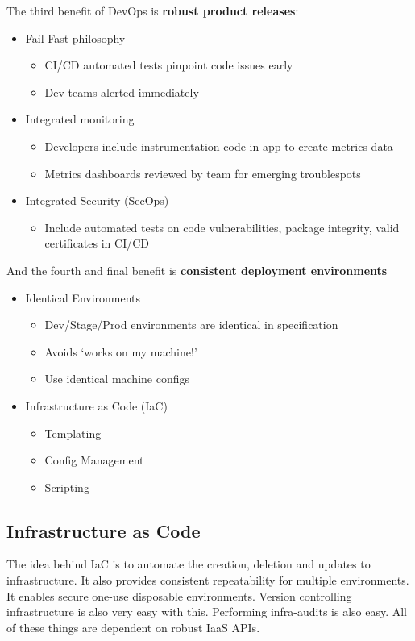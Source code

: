 \documentclass[11pt,a4paper,titlepage,dvipsnames,cmyk]{scrartcl}
\begin{document}
The third benefit of DevOps is \textbf{robust product releases}:
\begin{itemize}
    \item Fail-Fast philosophy
    \begin{itemize}
        \item CI/CD automated tests pinpoint code issues early
        \item Dev teams alerted immediately
    \end{itemize}
    \item Integrated monitoring
    \begin{itemize}
        \item Developers include instrumentation code in app to create metrics data
        \item Metrics dashboards reviewed by team for emerging troublespots
    \end{itemize}
    \item Integrated Security (SecOps)
    \begin{itemize}
        \item Include automated tests on code vulnerabilities, package integrity, valid certificates in CI/CD
    \end{itemize}
\end{itemize}

And the fourth and final benefit is \textbf{consistent deployment environments}
\begin{itemize}
    \item Identical Environments
    \begin{itemize}
        \item Dev/Stage/Prod environments are identical in specification
        \item Avoids `works on my machine!'
        \item Use identical machine configs
    \end{itemize}
    \item Infrastructure as Code (IaC)
    \begin{itemize}
        \item Templating
        \item Config Management
        \item Scripting
    \end{itemize}
\end{itemize}

\subsection{Infrastructure as Code}
The idea behind IaC is to automate the creation, deletion and updates to infrastructure. It also provides consistent repeatability for multiple environments. It enables secure one-use disposable environments. Version controlling infrastructure is also very easy with this. Performing infra-audits is also easy. All of these things are dependent on robust IaaS APIs.
\end{document}
